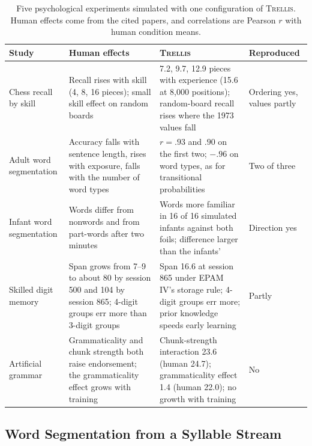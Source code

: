 \documentclass[11pt,letterpaper]{article}
\newcommand{\trellis}{\textsc{Trellis}}
\begin{document}
\begin{table}[!htbp]
\caption{Five psychological experiments simulated with one configuration of \trellis{}. Human effects come from the cited papers, and correlations are Pearson $r$ with human condition means.}
\label{tab:psych}
\begin{center}
\scriptsize
\begin{tabular}{p{}p{}p{}p{}}
\toprule
Study & Human effects & \trellis{} & Reproduced \\
\midrule
Chess recall by skill \citep{chase-simon,gobet-simon-random} & Recall rises with skill (4, 8, 16 pieces); small skill effect on random boards & 7.2, 9.7, 12.9 pieces with experience (15.6 at 8,000 positions); random-board recall rises where the 1973 values fall & Ordering yes, values partly \\
Adult word segmentation \citep{frank-segmentation} & Accuracy falls with sentence length, rises with exposure, falls with the number of word types & $r = .93$ and $.90$ on the first two; $-.96$ on word types, as for transitional probabilities & Two of three \\
Infant word segmentation \citep{saffran-infants} & Words differ from nonwords and from part-words after two minutes & Words more familiar in 16 of 16 simulated infants against both foils; difference larger than the infants' & Direction yes \\
Skilled digit memory \citep{richman-epam4} & Span grows from 7--9 to about 80 by session 500 and 104 by session 865; 4-digit groups err more than 3-digit groups & Span 16.6 at session 865 under EPAM IV's storage rule; 4-digit groups err more; prior knowledge speeds early learning & Partly \\
Artificial grammar \citep{knowlton-squire-agl,meulemans-vdl-acs} & Grammaticality and chunk strength both raise endorsement; the grammaticality effect grows with training & Chunk-strength interaction 23.6 (human 24.7); grammaticality effect 1.4 (human 22.0); no growth with training & No \\
\bottomrule
\end{tabular}
\end{center}
\end{table}

\subsection{Word Segmentation from a Syllable Stream}
\end{document}
